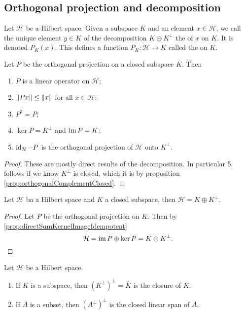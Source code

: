 \subsection{Orthogonal projection and decomposition}
\begin{definition}
Let $\mathcal{H}$ be a Hilbert space. Given a subspace $K$ and an element $x \in \mathcal{H}$, we call the unique element $y\in K$ of the decomposition $K\oplus K^\perp$ the  of $x$ on $K$. It is denoted $P_K(x)$. This defines a function $P_K:\mathcal{H}\to K$ called the  on $K$.
\end{definition}

\begin{proposition}
Let $P$ be the orthogonal projection on a closed subspace $K$. Then
\begin{enumerate}
\item $P$ is a linear operator on $\mathcal{H}$;
\item $\lVert Px\rVert\leq \lVert x\rVert$ for all $x\in\mathcal{H}$;
\item $P^2 = P$;
\item $\ker P = K^\perp$ and $\operatorname{im} P = K$;
\item $\operatorname{id}_\mathcal{H} - P$ is the orthogonal projection of $\mathcal{H}$ onto $K^\perp$.
\end{enumerate}
\end{proposition}
\begin{proof}
These are mostly direct results of the decomposition. In particular 5. follows if we know $K^\perp$ is closed, which it is by proposition \ref{prop:orthogonalComplementClosed}.
\end{proof}
\begin{corollary} \label{corollary:HilbertClosedSpaceOrthogonalDecomposition}
Let $\mathcal{H}$ ba a Hilbert space and $K$ a closed subspace, then $\mathcal{H} = K\oplus K^\perp$.
\end{corollary}
\begin{proof}
Let $P$ be the orthogonal projection on $K$. Then by \ref{prop:directSumKernelImageIdempotent}
\[ \mathcal{H} = \operatorname{im} P \oplus \ker P = K\oplus K^\perp. \]
\end{proof}
\begin{corollary} \label{corollary:doubleComplementClosure}
Let $\mathcal{H}$ be a Hilbert space.
\begin{enumerate}
\item If $K$ is a subspace, then $(K^\perp)^\perp = \overline{K}$ is the closure of $K$.
\item If $A$ is a subset, then $(A^\perp)^\perp$ is the closed linear span of $A$.
\end{enumerate}
\end{corollary}
